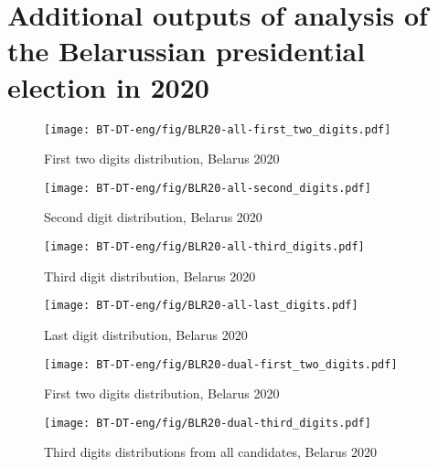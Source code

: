 \chapter{Additional outputs of analysis of the Belarussian presidential election in 2020}


\begin{figure}[h]
    \centering
    \caption{First two digits distribution, Belarus 2020}
    \texttt{[image: BT-DT-eng/fig/BLR20-all-first\_two\_digits.pdf]}
    \label{fig:BLR20-all-first_two_digits}
\end{figure}

\begin{figure}[h]
    \centering
    \caption{Second digit distribution, Belarus 2020}
    \texttt{[image: BT-DT-eng/fig/BLR20-all-second\_digits.pdf]}
    \label{fig:BLR20-all-second_digits}
\end{figure}

\begin{figure}[h]
    \centering
    \caption{Third digit distribution, Belarus 2020}
    \texttt{[image: BT-DT-eng/fig/BLR20-all-third\_digits.pdf]}
    \label{fig:BLR20-all-third_digits}
\end{figure}

\begin{figure}[h]
    \centering
    \caption{Last digit distribution, Belarus 2020}
    \texttt{[image: BT-DT-eng/fig/BLR20-all-last\_digits.pdf]}
    \label{fig:BLR20-all-last_digits}
\end{figure}

\begin{figure}[h]
    \centering
    \caption{First two digits distribution, Belarus 2020}
    \texttt{[image: BT-DT-eng/fig/BLR20-dual-first\_two\_digits.pdf]}
    \label{fig:BLR20-dual-first_two_digits}
\end{figure}

\begin{figure}[h]
    \centering
    \caption{Third digits distributions from all candidates, Belarus 2020}
    \texttt{[image: BT-DT-eng/fig/BLR20-dual-third\_digits.pdf]}
    \label{fig:BLR20-dual-third_digits}
\end{figure}







